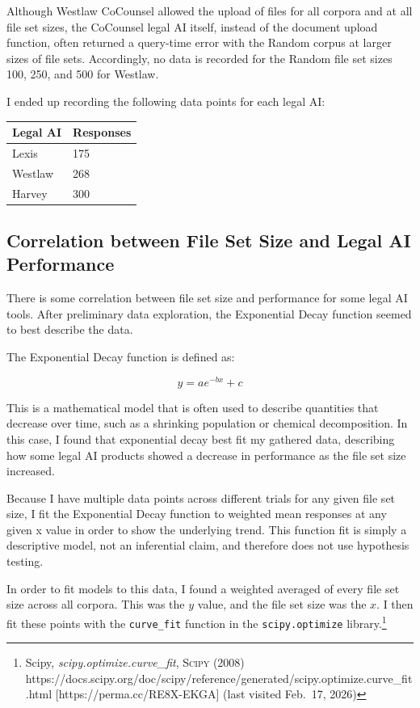 \documentclass[
]{article}
\newcounter{none} %
\begin{document}
Although Westlaw CoCounsel allowed the upload of files for all corpora
and at all file set sizes, the CoCounsel legal AI itself, instead of the
document upload function, often returned a query-time error with the
Random corpus at larger sizes of file sets. Accordingly, no data is
recorded for the Random file set sizes 100, 250, and 500 for Westlaw.

I ended up recording the following data points for each legal AI:

{\def\LTcaptype{none} %
\begin{longtable}[]{@{}ll@{}}
\toprule\noalign{}
Legal AI & Responses \\
\midrule\noalign{}
\endhead
\bottomrule\noalign{}
\endlastfoot
Lexis & 175 \\
Westlaw & 268 \\
Harvey & 300 \\
\end{longtable}
}

\subsection{Correlation between File Set Size and Legal AI
Performance}\label{correlation-between-file-set-size-and-legal-ai-performance}

There is some correlation between file set size and performance for some
legal AI tools. After preliminary data exploration, the Exponential
Decay function seemed to best describe the data.

The Exponential Decay function is defined as:

\[y = ae^{-bx} + c\]

This is a mathematical model that is often used to describe quantities
that decrease over time, such as a shrinking population or chemical
decomposition. In this case, I found that exponential decay best fit my
gathered data, describing how some legal AI products showed a decrease
in performance as the file set size increased.

Because I have multiple data points across different trials for any
given file set size, I fit the Exponential Decay function to weighted
mean responses at any given x value in order to show the underlying
trend. This function fit is simply a descriptive model, not an
inferential claim, and therefore does not use hypothesis testing.

In order to fit models to this data, I found a weighted averaged of
every file set size across all corpora. This was the \(y\) value, and
the file set size was the \(x\). I then fit these points with the
\texttt{curve\_fit} function in the \texttt{scipy.optimize}
library.\footnote{Scipy, \emph{scipy.optimize.curve\_fit},
  \textsc{Scipy} (2008)
  https://docs.scipy.org/doc/scipy/reference/generated/scipy.optimize.curve\_fit.html
  {[}https://perma.cc/RE8X-EKGA{]} (last visited Feb.~17, 2026)}
\end{document}
